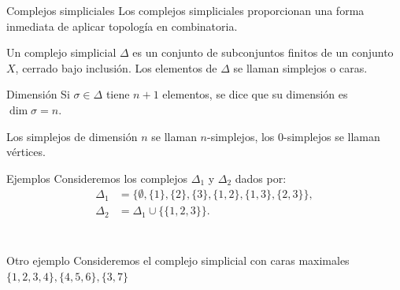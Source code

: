 \documentclass[spanish, presentation, aspectratio=169]{beamer}
\begin{document}
\begin{frame}[label={sec:org16cb05b}]{Complejos simpliciales}
Los complejos simpliciales proporcionan una forma inmediata de
aplicar topología en combinatoria.

\pause

\begin{definition}
Un \alert{complejo simplicial} \(\Delta\) es un conjunto de subconjuntos finitos de un conjunto \(X\), cerrado bajo inclusión. Los elementos de \(\Delta\) se llaman \alert{simplejos} o \alert{caras}.
\end{definition}

\begin{block}{Dimensión}
Si \(\sigma\in\Delta\) tiene \(n+1\) elementos, se dice que su
\alert{dimensión} es \(\dim\sigma=n\).

Los simplejos de dimensión \(n\) se llaman \(n\)-simplejos, los \(0\)-simplejos se llaman \alert{vértices}.
\end{block}
\end{frame}

\begin{frame}[label={sec:org75ea9ce}]{Ejemplos}
Consideremos los complejos \(\Delta_{1}\) y \(\Delta_{2}\) dados por:
\begin{align*}
\Delta_{1} &=\{\emptyset, \{1\},\{2\},\{3\},\{1,2\},\{1,3\},\{2,3\}\},\\
\Delta_{2} &=\Delta_{1}\cup\{\{1,2,3\}\}.
\end{align*}

\begin{columns}
\begin{column}{0.4\columnwidth}
\begin{figure}[htbp]
\centering

\end{figure}
\end{column}

\begin{column}{0.4\columnwidth}
\begin{figure}[htbp]
\centering

\end{figure}
\end{column}
\end{columns}
\end{frame}

\begin{frame}[label={sec:org0e6219b}]{Otro ejemplo}
Consideremos el complejo simplicial con caras maximales \(\{1,2,3,4\},\{4,5,6\},\{3,7\}\)

\begin{figure}[htbp]
\centering

\end{figure}
\end{frame}
\end{document}
